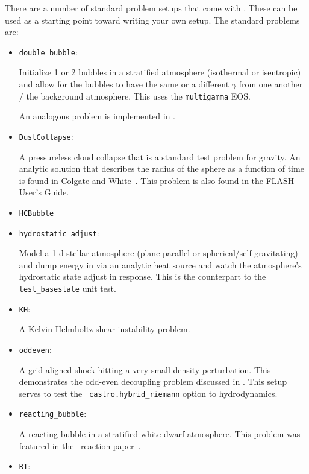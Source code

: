 There are a number of standard problem setups that come with \castro.
These can be used as a starting point toward writing your own setup.
The standard problems are:
\begin{itemize}

\item {\tt double\_bubble}:

  Initialize 1 or 2 bubbles in a stratified atmosphere (isothermal or
  isentropic) and allow for the bubbles to have the same or a
  different $\gamma$ from one another / the background atmosphere.  This
  uses the {\tt multigamma} EOS.

  An analogous problem is implemented in \maestro.
    
\item {\tt DustCollapse}:

  A pressureless cloud collapse that is a standard test problem for
  gravity.  An analytic solution that describes the radius of the
  sphere as a function of time is found in Colgate and
  White~\cite{colgwhite}.  This problem is also found in the FLASH
  User's Guide.
  
  
\item {\tt HCBubble}
  
\item {\tt hydrostatic\_adjust}:

  Model a 1-d stellar atmosphere (plane-parallel or
  spherical/self-gravitating) and dump energy in via an analytic heat
  source and watch the atmosphere's hydrostatic state adjust in
  response.  This is the counterpart to the \maestro\ {\tt
    test\_basestate} unit test.

\item {\tt KH}:

  A Kelvin-Helmholtz shear instability problem.
  
\item {\tt oddeven}:

  A grid-aligned shock hitting a very small density perturbation.
  This demonstrates the odd-even decoupling problem discussed in
  \cite{quirk1997}.  This setup serves to test the {\tt
    castro.hybrid\_riemann} option to hydrodynamics.
  
  
\item {\tt reacting\_bubble}:

  A reacting bubble in a stratified white dwarf atmosphere.  This
  problem was featured in the \maestro\ reaction
  paper~\cite{maestro:III}.

  
\item {\tt RT}:


\end{itemize}
